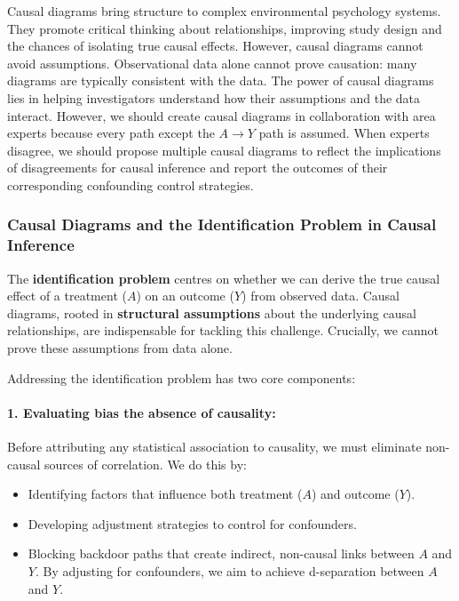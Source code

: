 \documentclass[
  singlecolumn]{article}
\let\oldparagraph\paragraph
\renewcommand{\paragraph}[1]{\oldparagraph{#1}\mbox{}}
\providecommand{\tightlist}{%
  \setlength{\itemsep}{0pt}\setlength{\parskip}{0pt}}\usepackage{longtable,booktabs,array}
\begin{document}
Causal diagrams bring structure to complex environmental psychology
systems. They promote critical thinking about relationships, improving
study design and the chances of isolating true causal effects. However,
causal diagrams cannot avoid assumptions. Observational data alone
cannot prove causation: many diagrams are typically consistent with the
data. The power of causal diagrams lies in helping investigators
understand how their assumptions and the data interact. However, we
should create causal diagrams in collaboration with area experts because
every path except the \(A\to Y\) path is assumed. When experts disagree,
we should propose multiple causal diagrams to reflect the implications
of disagreements for causal inference and report the outcomes of their
corresponding confounding control strategies.

\subsubsection{Causal Diagrams and the Identification Problem in Causal
Inference}\label{causal-diagrams-and-the-identification-problem-in-causal-inference}

The \textbf{identification problem} centres on whether we can derive the
true causal effect of a treatment (\(A\)) on an outcome (\(Y\)) from
observed data. Causal diagrams, rooted in \textbf{structural
assumptions} about the underlying causal relationships, are
indispensable for tackling this challenge. Crucially, we cannot prove
these assumptions from data alone.

Addressing the identification problem has two core components:

\paragraph{\texorpdfstring{1. \textbf{Evaluating bias the absence of
causality:}}{1. Evaluating bias the absence of causality:}}\label{evaluating-bias-the-absence-of-causality}

Before attributing any statistical association to causality, we must
eliminate non-causal sources of correlation. We do this by:

\begin{itemize}
\tightlist
\item
  Identifying factors that influence both treatment (\(A\)) and outcome
  (\(Y\)).
\item
  Developing adjustment strategies to control for confounders.
\item
  Blocking backdoor paths that create indirect, non-causal links between
  \(A\) and \(Y\). By adjusting for confounders, we aim to achieve
  d-separation between \(A\) and \(Y\).
\end{itemize}
\end{document}
